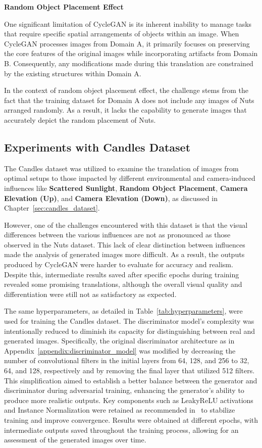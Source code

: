 \documentclass[12pt,DIV14,BCOR12mm,a4paper,footinclude=false,headinclude,parskip=half-,twoside,openright,cleardoublepage=empty,toc=index,bibliography=totoc,listof=totoc]{scrreprt}
\numberwithin{equation}{chapter}
\begin{document}
\textbf{Random Object Placement Effect}

One significant limitation of CycleGAN is its inherent inability to manage tasks that require specific spatial arrangements of objects within an image. When CycleGAN processes images from Domain A, it primarily focuses on preserving the core features of the original images while incorporating artifacts from Domain B. Consequently, any modifications made during this translation are constrained by the existing structures within Domain A.

In the context of random object placement effect, the challenge stems from the fact that the training dataset for Domain A does not include any images of Nuts arranged randomly. As a result, it lacks the capability to generate images that accurately depict the random placement of Nuts.

\subsection{Experiments with Candles Dataset}

The Candles dataset was utilized to examine the translation of images from optimal setups to those impacted by different environmental and camera-induced influences like \textbf{Scattered Sunlight}, \textbf{Random Object Placement}, \textbf{Camera Elevation (Up)}, and \textbf{Camera Elevation (Down)}, as discussed in Chapter~\ref{sec:candles_dataset}.

However, one of the challenges encountered with this dataset is that the visual differences between the various influences are not as pronounced as those observed in the Nuts dataset. This lack of clear distinction between influences made the analysis of generated images more difficult. As a result, the outputs produced by CycleGAN were harder to evaluate for accuracy and realism. Despite this, intermediate results saved after specific epochs during training revealed some promising translations, although the overall visual quality and differentiation were still not as satisfactory as expected.

The same hyperparameters, as detailed in Table~\ref{tab:hyperparameters}, were used for training the Candles dataset. The discriminator model's complexity was intentionally reduced to diminish its capacity for distinguishing between real and generated images. Specifically, the original discriminator architecture as in Appendix~\ref{appendix:discriminator_model} was modified by decreasing the number of convolutional filters in the initial layers from 64, 128, and 256 to 32, 64, and 128, respectively and by removing the final layer that utilized 512 filters. This simplification aimed to establish a better balance between the generator and discriminator during adversarial training, enhancing the generator's ability to produce more realistic outputs. Key components such as LeakyReLU activations and Instance Normalization were retained as recommended in~\cite{zhu2017unpaired} to stabilize training and improve convergence. Results were obtained at different epochs, with intermediate outputs saved throughout the training process, allowing for an assessment of the generated images over time. 
\end{document}
